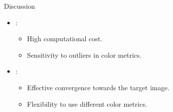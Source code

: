 \begin{frame}{Discussion}
    \begin{itemize}
        \item {}:
              \begin{itemize}
                  \item High computational cost.
                  \item Sensitivity to outliers in color metrics.
              \end{itemize}
        \item {}:
              \begin{itemize}
                  \item Effective convergence towards the target image.
                  \item Flexibility to use different color metrics.
              \end{itemize}
    \end{itemize}
\end{frame}

